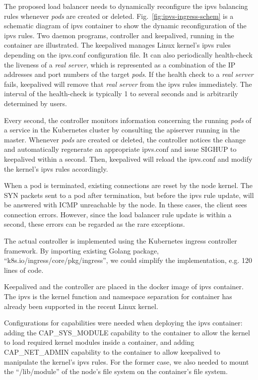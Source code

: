 The proposed load balancer needs to dynamically reconfigure the ipvs balancing rules whenever {\em pods} are created or deleted. 
Fig.~\ref{fig:ipvs-ingress-schem} is a schematic diagram of ipvs container to show the dynamic reconfiguration of the ipvs rules.
Two daemon programs, controller and keepalived, running in the container are illustrated.
The keepalived manages Linux kernel's ipvs rules depending on the ipvs.conf configuration file.
It can also periodically health-check the liveness of a {\em real server}, 
which is represented as a combination of the IP addresses and port numbers of the target {\em pods}. 
If the health check to a {\em real server} fails, keepalived will remove that {\em real server} from the ipvs rules immediately.
The interval of the health-check is typically 1 to several seconds and is arbitrarily determined by users.  

Every second, the controller monitors information concerning the running {\em pods} of a service 
in the Kubernetes cluster by consulting the apiserver running in the master.
Whenever {\em pods} are created or deleted, the controller notices the change and automatically regenerate an appropriate ipvs.conf 
and issue SIGHUP to keepalived within a second.
Then, keepalived will reload the ipvs.conf and modify the kernel's ipvs rules accordingly.

When a pod is terminated, existing connections are reset by the node kernel.
The SYN packets sent to a pod after termination, but before the ipvs rule update, will be answered with ICMP unreachable by the node.
In these cases, the client sees connection errors.
However, since the load balancer rule update is within a second, these errors can be regarded as the rare exceptions.

The actual controller\cite{ktaka_ccmp_2017_826894} is implemented using the Kubernetes ingress controller\cite{K8sIngress2017} framework. 
By importing existing Golang package, \enquote{k8s.io/ingress/core/pkg/ingress}, we could simplify the implementation, e.g. 
120 lines of code.  

Keepalived and the controller are placed in the docker image of ipvs container.
The ipvs is the kernel function and namespace separation for container has already been supported in the recent Linux kernel. 


Configurations for capabilities were needed when deploying the ipvs container: adding the CAP\_SYS\_MODULE capability 
to the container to allow the kernel to load required kernel modules inside a container, 
and adding CAP\_NET\_ADMIN capability to the container to allow keepalived to manipulate the kernel's ipvs rules. 
For the former case, we also needed to mount the \enquote{/lib/module} of the node's file system on the container's file system.

